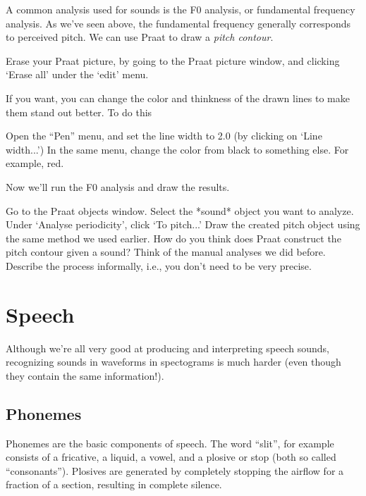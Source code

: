 \documentclass[a4paper, 9pt]{article}
\begin{document}
A common analysis used for sounds is the F0 analysis, or fundamental
frequency analysis. As we've seen above, the fundamental frequency
generally corresponds to perceived pitch. We can use Praat to draw a
\emph{pitch contour}.

\begin{exercise}
\action Erase your Praat picture, by going to the Praat picture window, and clicking `Erase all' under the `edit' menu.
\end{exercise}

If you want, you can change the color and thinkness of the drawn lines
to make them stand out better. To do this

\begin{exercise}
\action Open the ``Pen'' menu, and set the line width to 2.0 (by clicking on `Line width...')
\action In the same menu, change the color from black to something else. For example, red. 
\end{exercise}

Now we'll run the F0 analysis and draw the results.

\begin{exercise}
\action Go to the Praat objects window.
\action Select the *sound* object you want to analyze.
\action Under `Analyse periodicity', click `To pitch...'
\action Draw the created pitch object using the same method we used earlier.
\ask How do you think does Praat construct the pitch contour given a sound? Think of the manual analyses we did before. Describe the process informally, i.e., you don't need to be very precise.
\end{exercise}

\section{Speech}\label{speech}

Although we're all very good at producing and interpreting speech
sounds, recognizing sounds in waveforms in spectograms is much harder
(even though they contain the same information!).

\subsection{Phonemes}\label{phonemes}

Phonemes are the basic components of speech. The word ``slit'', for
example consists of a fricative, a liquid, a vowel, and a plosive or
stop (both so called ``consonants''). Plosives are generated by
completely stopping the airflow for a fraction of a section, resulting
in complete silence.
\end{document}
